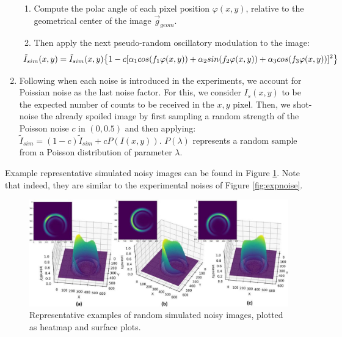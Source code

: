 \documentclass[11pt, a4paper, twoside]{article} %
\begin{document}
\begin{enumerate}
\begin{enumerate}
\item Compute the polar angle of each pixel position $\varphi(x,y)$, relative to the geometrical center of the image $\vec{g}_{geom}$.
\item Then apply the next pseudo-random oscillatory modulation to the image:
\begin{equation}\hspace*{-0.6cm}
\tilde{I}_{sim}(x,y) = \tilde{I}_{sim}(x,y)\qty{1-c[\alpha_1cos(f_1\varphi(x,y)) +\alpha_2sin(f_2\varphi(x,y)) +\alpha_3cos(f_3\varphi(x,y))]^2}
\end{equation}
\end{enumerate}
\item Following when each noise is introduced in the experiments, we account for Poissian noise as the last noise factor. For this, we consider $I_s(x,y)$ to be the expected number of counts to be received in the $x,y$ pixel. Then, we shot-noise the already spoiled image by first sampling a random strength of the Poisson noise $c$ in $(0,0.5)$ and then applying: $\tilde{I}_{sim}=(1-c)\tilde{I}_{sim}+cP(I(x,y))$. $P(\lambda)$ represents a random sample from a Poisson distribution of parameter $\lambda$.
\end{enumerate}
Example representative simulated noisy images can be found in Figure \ref{fig:artifNoise}. Note that indeed, they are similar to the experimental noises of Figure \ref{fig:expnoise}.

\begin{figure}[h!] 
     \centering 
    \includegraphics[width=0.92\linewidth]{artif.jpg}
    \caption{Representative examples of random simulated noisy images, plotted as heatmap and surface plots.}
    \label{fig:artifNoise}
\end{figure}
\end{document}
